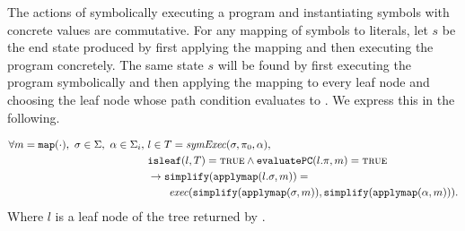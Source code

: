 \begin{property}[Commutativity]
  \label{prop:kingcommutativity}
  The actions of symbolically executing a program and instantiating symbols with
  concrete values are commutative. For any mapping of symbols to literals, let
  $s$ be the end state produced by first applying the mapping and then executing
  the program concretely. The
  same state $s$ will be found by first executing the program symbolically and
  then applying the mapping to every leaf node and choosing the leaf node whose path condition
  evaluates to \texttrue. We express this in the following.




\begin{align*}
\forall m = \mathtt{map(\cdot)},~\sigma \in \Sigma,~\alpha \in \Sigma_i,~& l \in T = \mathit{symExec}(\sigma,\pi_0,\alpha), \\
&\mathtt{isleaf}(l,T)  = \mathtt{\textsc{true}} \wedge
\mathtt{evaluatePC}(l.\pi,m) = \mathtt{\textsc{true}} \\
&\rightarrow \mathtt{simplify}(\mathtt{applymap}(l.\sigma,m)) = \\
&\qquad\mathit{exec}(\mathtt{simplify}(\mathtt{applymap}(\sigma,m)),\mathtt{simplify}(\mathtt{applymap}(\alpha,m))).
\end{align*}
Where $l$ is a leaf node of the tree returned by \symexecution.


\end{property}


